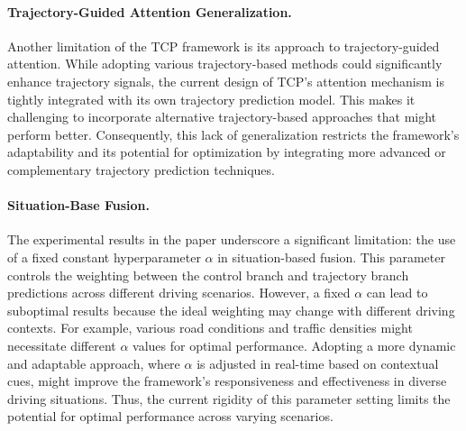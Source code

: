 \paragraph{Trajectory-Guided Attention Generalization.} 
Another limitation of the TCP framework is its approach to trajectory-guided attention. While adopting various trajectory-based methods could significantly enhance trajectory signals, the current design of TCP's attention mechanism is tightly integrated with its own trajectory prediction model. This makes it challenging to incorporate alternative trajectory-based approaches that might perform better. Consequently, this lack of generalization restricts the framework's adaptability and its potential for optimization by integrating more advanced or complementary trajectory prediction techniques.

\paragraph{Situation-Base Fusion.} The experimental results in the paper underscore a significant limitation: the use of a fixed constant hyperparameter \(\alpha\) in situation-based fusion. This parameter controls the weighting between the control branch and trajectory branch predictions across different driving scenarios. However, a fixed \(\alpha\) can lead to suboptimal results because the ideal weighting may change with different driving contexts. For example, various road conditions and traffic densities might necessitate different \(\alpha\) values for optimal performance. Adopting a more dynamic and adaptable approach, where \(\alpha\) is adjusted in real-time based on contextual cues, might improve the framework's responsiveness and effectiveness in diverse driving situations. Thus, the current rigidity of this parameter setting limits the potential for optimal performance across varying scenarios.